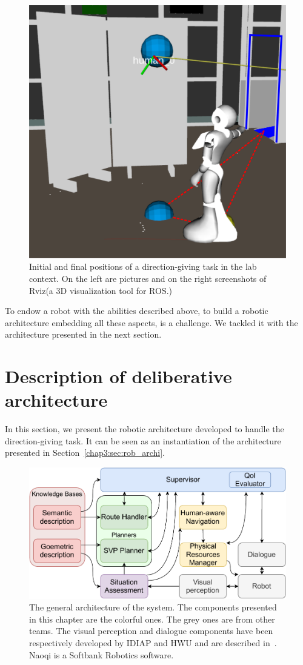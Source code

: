 \documentclass[a4paper,11pt,twoside]{StyleThese}
\begin{document}
\begin{figure}[!ht]
{\begin{minipage}{\linewidth}
			\includegraphics[width=.4\linewidth]{figures/chapter3/final_pose.jpg}
		\end{minipage}
	}\par  
	\caption[pos]{Initial and final positions of a direction-giving task in the lab context. On the left are pictures and on the right screenshots of Rviz\footnotemark (a 3D visualization tool for ROS.)}
	\label{fig:chap3_dir_giving_task}
\end{figure}


To endow a robot with the abilities described above, to build a robotic architecture embedding all these aspects, is a challenge. We tackled it with the architecture presented in the next section.

\section{Description of deliberative architecture}\label{sec:globalarchi}

In this section, we present the robotic architecture developed to handle the direction-giving task. It can be seen as an instantiation of the architecture presented in Section~\ref{chap3:sec:rob_archi}.  

\begin{figure}[ht!]
	\centering
	\includegraphics[width=\textwidth]{figures/chapter3/schema_archi.pdf}
	\caption{\label{fig:chap3_architecture} The general architecture of the system. The components presented in this chapter are the colorful ones. The grey ones are from other teams. The visual perception and dialogue components have been respectively developed by IDIAP and HWU and are described in~\citep{foster_2019_mummer}. Naoqi is a Softbank Robotics software.}
\end{figure}
\end{document}
